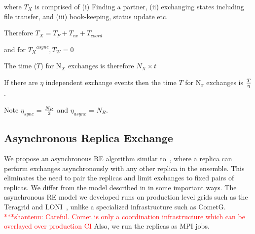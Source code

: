 \documentclass{rspublic}
\newcommand{\jhanote}[1]{ {\textcolor{red} { ***shantenu: #1 }}}
\newcommand{\jhanote}[1]{}
\begin{document}
where $T_{X}$ is comprised of (i) Finding a partner, (ii) exchanging
states including file transfer, and (iii) book-keeping, status update
etc. 

Therefore ${T_{X}} = {T_F + T_{ex} + T_{coord}}$ 


and for ${T_{X}}^{async}, T_W = 0$


The time ($T$) for N$_{X}$ exchanges is therefore $N_{X} \times t$

If there are $\eta$ independent exchange events then the time $T$ for 
N$_x$ exchanges is $T \over \eta$.

Note $\eta_{sync}$ = $N_R \over 2$ and $\eta_{async}$ = $N_R $. \\






  
\subsection{Asynchronous Replica Exchange}


We propose an asynchronous RE algorithm similar
to~\citep{parashar_arepex}, where a replica can perform exchanges
asynchronously with any other replica in the ensemble. This eliminates
the need to pair the replicas and limit exchanges to fixed pairs of
replicas. We differ from the model described in \cite{parashar_arepex}
in some important ways. The asynchronous RE model we developed runs on
production level grids such as the Teragrid and LONI~\citep{LONI_web},
unlike a specialized infrastructure such as CometG.
\jhanote{Careful. Comet is only a coordination infrastructure which
  can be overlayed over production CI} Also, we run the replicas as
MPI jobs.

\end{document}
